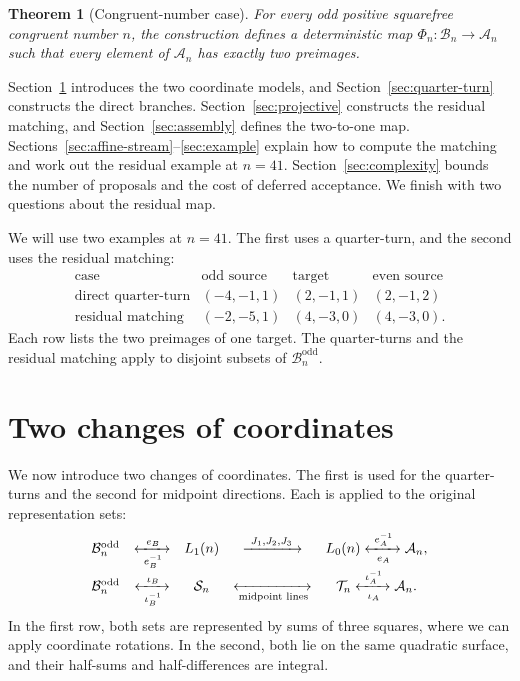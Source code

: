 \documentclass[11pt]{amsart}
\newtheorem{theorem}{Theorem}[section]
\theoremstyle{definition}
\theoremstyle{remark}
\newcommand{\Bn}{\mathcal B_n}
\newcommand{\An}{\mathcal A_n}
\newcommand{\Bodd}{\mathcal B_n^{\mathrm{odd}}}
\newcommand{\Sn}{\mathcal S_n}
\newcommand{\Tn}{\mathcal T_n}
\begin{document}
\begin{theorem}[Congruent-number case]\label{thm:congruent}
For every odd positive squarefree congruent number $n$, the construction
defines a deterministic map $\Phi_n:\Bn\to\An$ such that every element of
$\An$ has exactly two preimages.
\end{theorem}

Section~\ref{sec:coordinates} introduces the two coordinate models, and
Section~\ref{sec:quarter-turn} constructs the direct branches.
Section~\ref{sec:projective} constructs the residual matching, and
Section~\ref{sec:assembly} defines the two-to-one map.
Sections~\ref{sec:affine-stream}--\ref{sec:example} explain how to compute the
matching and work out the residual example at $n=41$.
Section~\ref{sec:complexity} bounds the number of proposals and the cost of
deferred acceptance.  We finish with two questions about the residual map.

We will use two examples at $n=41$.  The first uses a quarter-turn, and the
second uses the residual matching:
\[
\begin{array}{c|c|c|c}
\text{case}&\text{odd source}&\text{target}&\text{even source}\\ \hline
\text{direct quarter-turn}&(-4,-1,1)&(2,-1,1)&(2,-1,2)\\
\text{residual matching}&(-2,-5,1)&(4,-3,0)&(4,-3,0).
\end{array}
\]
Each row lists the two preimages of one target.  The quarter-turns and the
residual matching apply to disjoint subsets of $\Bodd$.

\section{Two changes of coordinates}
\label{sec:coordinates}

We now introduce two changes of coordinates.  The first is used for the
quarter-turns and the second for midpoint directions.  Each is applied to
the original representation sets:
\[
\begin{array}{ccccc}
\Bodd&\xleftrightarrow[\ e_B^{-1}\ ]{\ e_B\ }&L_1(n)
&\xrightarrow{\ J_1,J_2,J_3\ }&L_0(n)
\xleftrightarrow[\ e_A\ ]{\ e_A^{-1}\ }\An,\\[5pt]
\Bodd&\xleftrightarrow[\ \iota_B^{-1}\ ]{\ \iota_B\ }&\Sn
&\xleftrightarrow[\text{midpoint lines}]{}&\Tn
\xleftrightarrow[\ \iota_A\ ]{\ \iota_A^{-1}\ }\An.
\end{array}
\]
In the first row, both sets are represented by sums of three squares, where
we can apply coordinate rotations.  In the second, both lie on the same
quadratic surface, and their half-sums and half-differences are integral.
\end{document}

